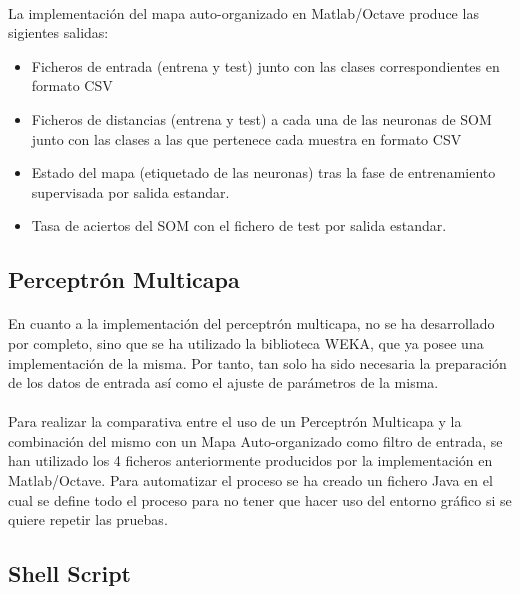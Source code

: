 \documentclass[10pt, a4paper,spanish]{article}
\begin{document}
			\paragraph{}
			La implementación del mapa auto-organizado en Matlab/Octave produce las sigientes salidas:

			\begin{itemize}
				\item Ficheros de entrada (entrena y test) junto con las clases correspondientes en formato CSV
				\item Ficheros de distancias (entrena y test) a cada una de las neuronas de SOM junto con las clases a las que pertenece cada muestra en formato CSV
				\item Estado del mapa (etiquetado de las neuronas) tras la fase de entrenamiento supervisada por salida estandar.
				\item Tasa de aciertos del SOM con el fichero de test por salida estandar.
			\end{itemize}

		\subsection{Perceptrón Multicapa}

			\paragraph{}
			En cuanto a la implementación del perceptrón multicapa, no se ha desarrollado por completo, sino que se ha utilizado la biblioteca WEKA, que ya posee una implementación de la misma. Por tanto, tan solo ha sido necesaria la preparación de los datos de entrada así como el ajuste de parámetros de la misma.

			\paragraph{}
			Para realizar la comparativa entre el uso de un Perceptrón Multicapa y la combinación del mismo con un Mapa Auto-organizado como filtro de entrada, se han utilizado los 4 ficheros anteriormente producidos por la implementación en Matlab/Octave. Para automatizar el proceso se ha creado un fichero Java en el cual se define todo el proceso para no tener que hacer uso del entorno gráfico si se quiere repetir las pruebas.

		\subsection{Shell Script}
\end{document}
